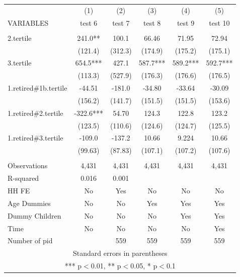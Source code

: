 \begin{tabular}{lccccc} \hline
 & (1) & (2) & (3) & (4) & (5) \\
VARIABLES & test 6 & test 7 & test 8 & test 9 & test 10 \\ \hline
 &  &  &  &  &  \\
2.tertile & 241.0** & 100.1 & 66.46 & 71.95 & 72.94 \\
 & (121.4) & (312.3) & (174.9) & (175.2) & (175.1) \\
3.tertile & 654.5*** & 427.1 & 587.7*** & 589.2*** & 592.7*** \\
 & (113.3) & (527.9) & (176.3) & (176.6) & (176.5) \\
1.retired\#1b.tertile & -44.51 & -181.0 & -34.80 & -33.64 & -30.09 \\
 & (156.2) & (141.7) & (151.5) & (151.5) & (153.6) \\
1.retired\#2.tertile & -322.6*** & 54.70 & 124.3 & 122.8 & 123.2 \\
 & (123.5) & (110.6) & (124.6) & (124.7) & (125.5) \\
1.retired\#3.tertile & -109.0 & -137.2 & 10.66 & 9.224 & 10.66 \\
 & (99.63) & (87.83) & (107.1) & (107.2) & (107.6) \\
 &  &  &  &  &  \\
Observations & 4,431 & 4,431 & 4,431 & 4,431 & 4,431 \\
R-squared & 0.016 & 0.001 &  &  &  \\
HH FE & No & Yes & No & No & No \\
Age Dummies & No & No & Yes & Yes & Yes \\
Dummy Children & No & No & No & Yes & Yes \\
Time & No & No & No & No & Yes \\
 Number of pid &  & 559 & 559 & 559 & 559 \\ \hline
\multicolumn{6}{c}{ Standard errors in parentheses} \\
\multicolumn{6}{c}{ *** p$<$0.01, ** p$<$0.05, * p$<$0.1} \\
\end{tabular}
